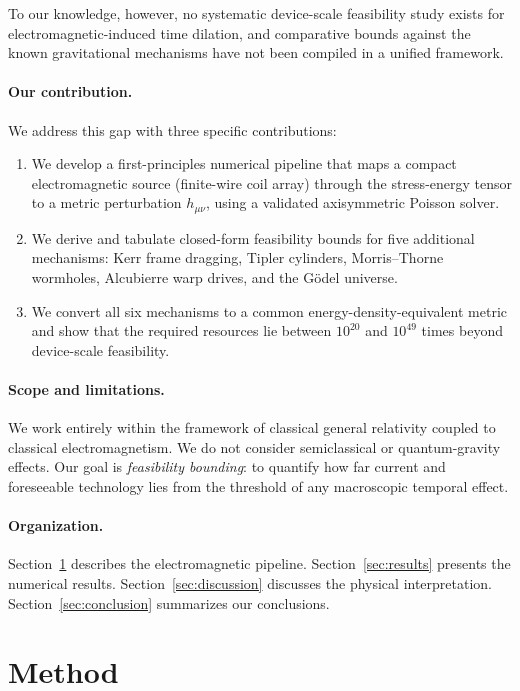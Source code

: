 \documentclass[11pt,a4paper,twocolumn]{article}
\begin{document}
To our knowledge, however, no systematic device-scale feasibility study exists for electromagnetic-induced time dilation, and comparative bounds against the known gravitational mechanisms have not been compiled in a unified framework.

\paragraph{Our contribution.} We address this gap with three specific contributions:

\begin{enumerate}
\item We develop a first-principles numerical pipeline that maps a compact electromagnetic source (finite-wire coil array) through the stress-energy tensor to a metric perturbation $h_{\mu\nu}$, using a validated axisymmetric Poisson solver.
\item We derive and tabulate closed-form feasibility bounds for five additional mechanisms: Kerr frame dragging, Tipler cylinders, Morris--Thorne wormholes, Alcubierre warp drives, and the G\"odel universe.
\item We convert all six mechanisms to a common energy-density-equivalent metric and show that the required resources lie between $10^{20}$ and $10^{49}$ times beyond device-scale feasibility.
\end{enumerate}

\paragraph{Scope and limitations.} We work entirely within the framework of classical general relativity coupled to classical electromagnetism. We do not consider semiclassical or quantum-gravity effects. Our goal is \emph{feasibility bounding}: to quantify how far current and foreseeable technology lies from the threshold of any macroscopic temporal effect.

\paragraph{Organization.} Section~\ref{sec:method} describes the electromagnetic pipeline. Section~\ref{sec:results} presents the numerical results. Section~\ref{sec:discussion} discusses the physical interpretation. Section~\ref{sec:conclusion} summarizes our conclusions.
\section{Method}
\label{sec:method}
\end{document}
